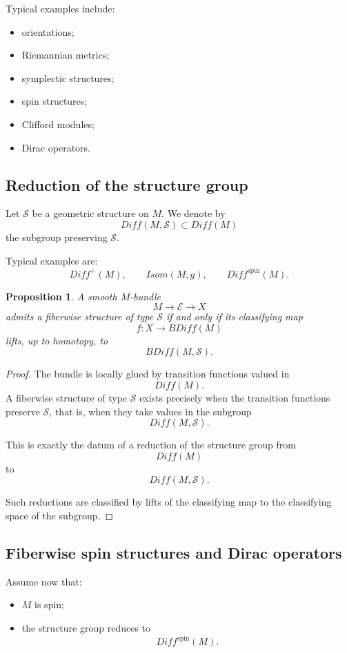 \documentclass[11pt]{amsart}
\newtheorem{proposition}[theorem]{Proposition}
\begin{document}
Typical examples include:
\begin{itemize}
\item orientations;
\item Riemannian metrics;
\item symplectic structures;
\item spin structures;
\item Clifford modules;
\item Dirac operators.
\end{itemize}

\subsection{Reduction of the structure group}

Let \(\mathcal S\) be a geometric structure on \(M\). We denote by
\[
Diff(M,\mathcal S)
\subset
Diff(M)
\]
the subgroup preserving \(\mathcal S\).

Typical examples are:
\[
Diff^+(M),
\qquad
Isom(M,g),
\qquad
Diff^{\mathrm{spin}}(M).
\]

\begin{proposition}
A smooth \(M\)-bundle
\[
M\longrightarrow \mathcal E\longrightarrow X
\]
admits a fiberwise structure of type \(\mathcal S\) if and only if its
classifying map
\[
f:X\longrightarrow BDiff(M)
\]
lifts, up to homotopy, to
\[
BDiff(M,\mathcal S).
\]
\end{proposition}

\begin{proof}
The bundle is locally glued by transition functions valued in
\[
Diff(M).
\]
A fiberwise structure of type \(\mathcal S\) exists precisely when the
transition functions preserve \(\mathcal S\), that is, when they take values
in the subgroup
\[
Diff(M,\mathcal S).
\]

This is exactly the datum of a reduction of the structure group from
\[
Diff(M)
\]
to
\[
Diff(M,\mathcal S).
\]

Such reductions are classified by lifts of the classifying map to the
classifying space of the subgroup.
\end{proof}

\subsection{Fiberwise spin structures and Dirac operators}

Assume now that:
\begin{itemize}
\item \(M\) is spin;
\item the structure group reduces to
\[
Diff^{\mathrm{spin}}(M).
\]
\end{itemize}
\end{document}
